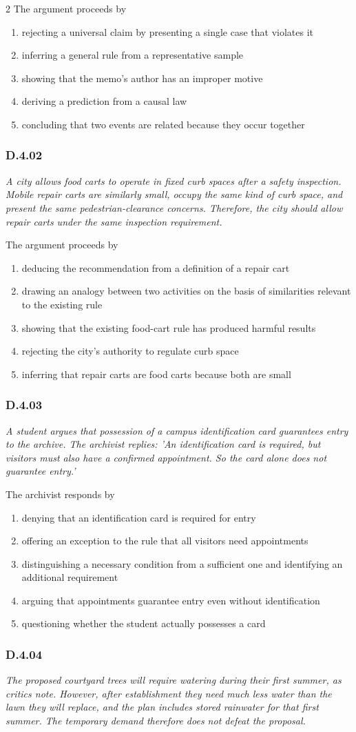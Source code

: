\documentclass[10pt]{extarticle}
\newcommand{\choice}[1]{\item #1}
\newcommand{\bankitem}[1]{\subsubsection*{#1}}
\begin{document}
\begin{multicols}{2}
The argument proceeds by
\begin{enumerate}[label=(\alph*)]
  \choice{rejecting a universal claim by presenting a single case that violates it}
  \choice{inferring a general rule from a representative sample}
  \choice{showing that the memo's author has an improper motive}
  \choice{deriving a prediction from a causal law}
  \choice{concluding that two events are related because they occur together}
\end{enumerate}
\bankitem{D.4.02}
\emph{A city allows food carts to operate in fixed curb spaces after a safety inspection. Mobile repair carts are similarly small, occupy the same kind of curb space, and present the same pedestrian-clearance concerns. Therefore, the city should allow repair carts under the same inspection requirement.}

The argument proceeds by
\begin{enumerate}[label=(\alph*)]
  \choice{deducing the recommendation from a definition of a repair cart}
  \choice{drawing an analogy between two activities on the basis of similarities relevant to the existing rule}
  \choice{showing that the existing food-cart rule has produced harmful results}
  \choice{rejecting the city's authority to regulate curb space}
  \choice{inferring that repair carts are food carts because both are small}
\end{enumerate}
\bankitem{D.4.03}
\emph{A student argues that possession of a campus identification card guarantees entry to the archive. The archivist replies: 'An identification card is required, but visitors must also have a confirmed appointment. So the card alone does not guarantee entry.'}

The archivist responds by
\begin{enumerate}[label=(\alph*)]
  \choice{denying that an identification card is required for entry}
  \choice{offering an exception to the rule that all visitors need appointments}
  \choice{distinguishing a necessary condition from a sufficient one and identifying an additional requirement}
  \choice{arguing that appointments guarantee entry even without identification}
  \choice{questioning whether the student actually possesses a card}
\end{enumerate}
\bankitem{D.4.04}
\emph{The proposed courtyard trees will require watering during their first summer, as critics note. However, after establishment they need much less water than the lawn they will replace, and the plan includes stored rainwater for that first summer. The temporary demand therefore does not defeat the proposal.}


\end{multicols}
\end{document}
